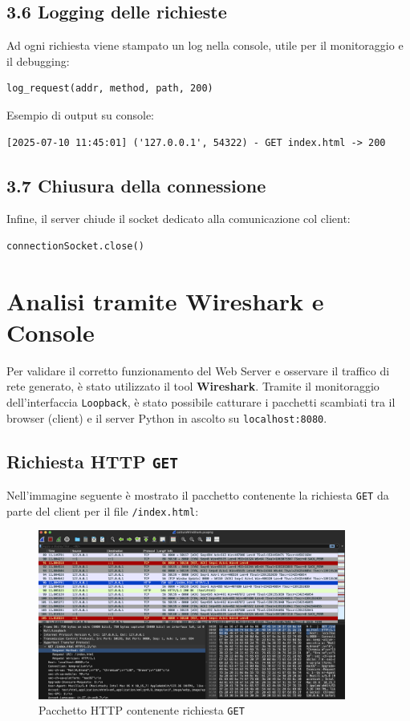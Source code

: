 \documentclass[a4paper,12pt]{report}
\begin{document}
\section{3.6 Logging delle richieste}

Ad ogni richiesta viene stampato un log nella console, utile per il monitoraggio e il debugging:

\begin{verbatim}
log_request(addr, method, path, 200)
\end{verbatim}

Esempio di output su console:

\begin{verbatim}
[2025-07-10 11:45:01] ('127.0.0.1', 54322) - GET index.html -> 200
\end{verbatim}



\section{3.7 Chiusura della connessione}

Infine, il server chiude il socket dedicato alla comunicazione col client:

\begin{verbatim}
connectionSocket.close()
\end{verbatim}
\chapter{Analisi tramite Wireshark e Console}

Per validare il corretto funzionamento del Web Server e osservare il traffico di rete generato, è stato utilizzato il tool \textbf{Wireshark}. Tramite il monitoraggio dell’interfaccia \texttt{Loopback}, è stato possibile catturare i pacchetti scambiati tra il browser (client) e il server Python in ascolto su \texttt{localhost:8080}.

\section{Richiesta HTTP \texttt{GET}}

Nell’immagine seguente è mostrato il pacchetto contenente la richiesta \texttt{GET} da parte del client per il file \texttt{/index.html}:

\begin{figure}[H]
    \centering
    \includegraphics[width=0.9\textwidth]{Images/getRequest.png}
    \caption{Pacchetto HTTP contenente richiesta \texttt{GET}}
\end{figure}
\end{document}
